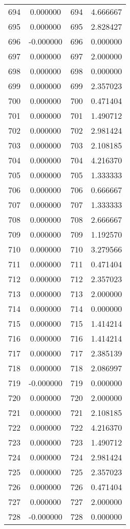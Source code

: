 \documentclass[12pt]{article}
\begin{document}
\begin{longtable}{@{}cccc@{}}
694 & 0.000000 & 694 & 4.666667 \\
695 & 0.000000 & 695 & 2.828427 \\
696 & -0.000000 & 696 & 0.000000 \\
697 & 0.000000 & 697 & 2.000000 \\
698 & 0.000000 & 698 & 0.000000 \\
699 & 0.000000 & 699 & 2.357023 \\
700 & 0.000000 & 700 & 0.471404 \\
701 & 0.000000 & 701 & 1.490712 \\
702 & 0.000000 & 702 & 2.981424 \\
703 & 0.000000 & 703 & 2.108185 \\
704 & 0.000000 & 704 & 4.216370 \\
705 & 0.000000 & 705 & 1.333333 \\
706 & 0.000000 & 706 & 0.666667 \\
707 & 0.000000 & 707 & 1.333333 \\
708 & 0.000000 & 708 & 2.666667 \\
709 & 0.000000 & 709 & 1.192570 \\
710 & 0.000000 & 710 & 3.279566 \\
711 & 0.000000 & 711 & 0.471404 \\
712 & 0.000000 & 712 & 2.357023 \\
713 & 0.000000 & 713 & 2.000000 \\
714 & 0.000000 & 714 & 0.000000 \\
715 & 0.000000 & 715 & 1.414214 \\
716 & 0.000000 & 716 & 1.414214 \\
717 & 0.000000 & 717 & 2.385139 \\
718 & 0.000000 & 718 & 2.086997 \\
719 & -0.000000 & 719 & 0.000000 \\
720 & 0.000000 & 720 & 2.000000 \\
721 & 0.000000 & 721 & 2.108185 \\
722 & 0.000000 & 722 & 4.216370 \\
723 & 0.000000 & 723 & 1.490712 \\
724 & 0.000000 & 724 & 2.981424 \\
725 & 0.000000 & 725 & 2.357023 \\
726 & 0.000000 & 726 & 0.471404 \\
727 & 0.000000 & 727 & 2.000000 \\
728 & -0.000000 & 728 & 0.000000 \\

\end{longtable}
\end{document}
